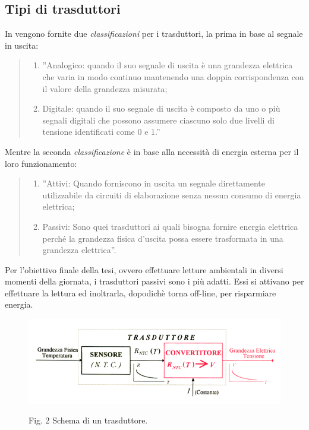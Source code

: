 \documentclass[a4paper]{report} %
\begin{document}
\subsection{Tipi di trasduttori}
In \cite{art:rif.11} vengono fornite due \textit{classificazioni} per i trasduttori, la prima in base al segnale in uscita:
\begin{quote}	
	\begin{enumerate}
		\item ''Analogico: quando il suo segnale di uscita è una grandezza elettrica che varia in modo continuo mantenendo una doppia corrispondenza con il valore della grandezza misurata;
		\item Digitale: quando il suo segnale di uscita è composto da uno o più segnali digitali che possono assumere ciascuno solo due livelli di tensione identificati come 0 e 1.''
	\end{enumerate}
\end{quote}
Mentre la seconda \textit{classificazione} è in base alla necessità di energia esterna per il loro funzionamento:
\begin{quote}
	\begin{enumerate}
		\item ''Attivi: Quando forniscono in uscita un segnale direttamente utilizzabile da circuiti di elaborazione senza nessun consumo di energia elettrica;
		\item Passivi: Sono quei trasduttori ai quali bisogna fornire energia elettrica perché la grandezza fisica d'uscita possa essere trasformata in una grandezza elettrica''. 
	\end{enumerate}
\end{quote}
Per l'obiettivo finale della tesi, ovvero effettuare letture ambientali in diversi momenti della giornata, i trasduttori passivi sono i più adatti. Essi si attivano per effettuare la lettura ed inoltrarla, dopodichè torna off-line, per risparmiare energia. 

\begin{figure}
\centering
\includegraphics[scale=.7]{Immagini/trasduttore.png}

Fig. 2 Schema di un trasduttore. \cite{art:rif.33}
\end{figure}
\end{document}
